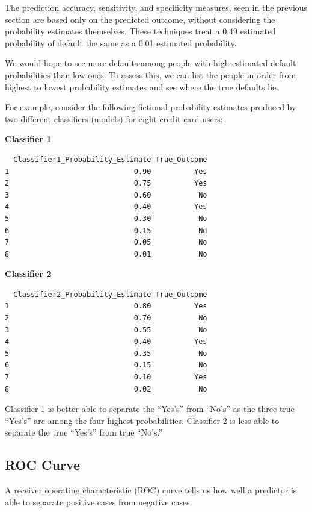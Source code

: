 \documentclass[
  letterpaper,
  DIV=11,
  numbers=noendperiod]{scrreprt}
\begin{document}
The prediction accuracy, sensitivity, and specificity measures, seen in
the previous section are based only on the predicted outcome, without
considering the probability estimates themselves. These techniques treat
a 0.49 estimated probability of default the same as a 0.01 estimated
probability.

We would hope to see more defaults among people with high estimated
default probabilities than low ones. To assess this, we can list the
people in order from highest to lowest probability estimates and see
where the true defaults lie.

For example, consider the following fictional probability estimates
produced by two different classifiers (models) for eight credit card
users:

\textbf{Classifier 1}

\begin{verbatim}
  Classifier1_Probability_Estimate True_Outcome
1                             0.90          Yes
2                             0.75          Yes
3                             0.60           No
4                             0.40          Yes
5                             0.30           No
6                             0.15           No
7                             0.05           No
8                             0.01           No
\end{verbatim}

\textbf{Classifier 2}

\begin{verbatim}
  Classifier2_Probability_Estimate True_Outcome
1                             0.80          Yes
2                             0.70           No
3                             0.55           No
4                             0.40          Yes
5                             0.35           No
6                             0.15           No
7                             0.10          Yes
8                             0.02           No
\end{verbatim}

Classifier 1 is better able to separate the ``Yes's'' from ``No's'' as
the three true ``Yes's'' are among the four highest probabilities.
Classifier 2 is less able to separate the true ``Yes's'' from true
``No's.''

\subsection{ROC Curve}\label{roc-curve}

A receiver operating characteristic (ROC) curve tells us how well a
predictor is able to separate positive cases from negative cases.
\end{document}
